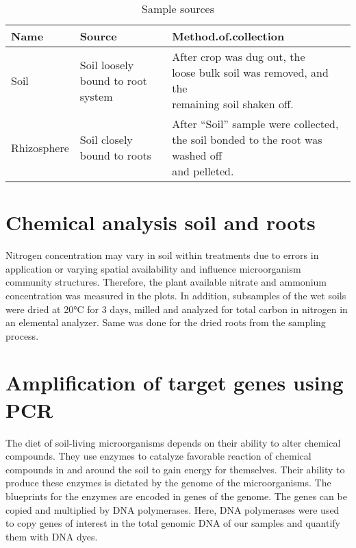 \documentclass[twoside,12pt,final]{ucthesis-CA2012}
\begin{document}
\begin{ucmainmatter}
\begin{table}
\caption{\label{tab:sample}Sample sources}
\centering
\begin{tabular}[t]{lll}
\toprule
Name & Source & Method.of.collection\\
\midrule
Soil & \makecell[l]{Soil loosely \\bound to root system} & \makecell[l]{After crop was dug out, the\\ loose bulk soil was removed, and the\\ remaining soil shaken off.}\\
Rhizosphere & \makecell[l]{Soil closely \\bound to roots} & \makecell[l]{After “Soil” sample were collected,\\ the soil bonded to the root was washed off\\and pelleted.}\\
\bottomrule
\end{tabular}
\end{table}
\hypertarget{chemical-analysis-soil-and-roots}{%
\section{Chemical analysis soil and roots}\label{chemical-analysis-soil-and-roots}}

Nitrogen concentration may vary in soil within treatments due to errors in application or varying spatial availability and influence microorganism community structures. Therefore, the plant available nitrate and ammonium concentration was measured in the plots. In addition, subsamples of the wet soils were dried at 20°C for 3 days, milled and analyzed for total carbon in nitrogen in an elemental analyzer. Same was done for the dried roots from the sampling process.

\hypertarget{amplification-of-target-genes-using-pcr}{%
\section{Amplification of target genes using PCR}\label{amplification-of-target-genes-using-pcr}}

The diet of soil-living microorganisms depends on their ability to alter chemical compounds. They use enzymes to catalyze favorable reaction of chemical compounds in and around the soil to gain energy for themselves. Their ability to produce these enzymes is dictated by the genome of the microorganisms. The blueprints for the enzymes are encoded in genes of the genome. The genes can be copied and multiplied by DNA polymerases. Here, DNA polymerases were used to copy genes of interest in the total genomic DNA of our samples and quantify them with DNA dyes.


\end{ucmainmatter}
\end{document}
